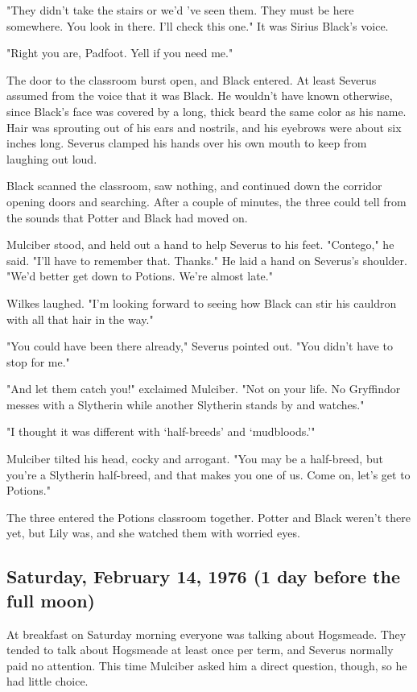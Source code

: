 "They didn't take the stairs or we'd 've seen them. They must be here somewhere. You look in there. I'll check this one." It was Sirius Black's voice.

"Right you are, Padfoot. Yell if you need me."

The door to the classroom burst open, and Black entered. At least Severus assumed from the voice that it was Black. He wouldn't have known otherwise, since Black's face was covered by a long, thick beard the same color as his name. Hair was sprouting out of his ears and nostrils, and his eyebrows were about six inches long. Severus clamped his hands over his own mouth to keep from laughing out loud.

Black scanned the classroom, saw nothing, and continued down the corridor opening doors and searching. After a couple of minutes, the three could tell from the sounds that Potter and Black had moved on.

Mulciber stood, and held out a hand to help Severus to his feet. "Contego," he said. "I'll have to remember that. Thanks." He laid a hand on Severus's shoulder. "We'd better get down to Potions. We're almost late."

Wilkes laughed. "I'm looking forward to seeing how Black can stir his cauldron with all that hair in the way."

"You could have been there already," Severus pointed out. "You didn't have to stop for me."

"And let them catch you!" exclaimed Mulciber. "Not on your life. No Gryffindor messes with a Slytherin while another Slytherin stands by and watches."

"I thought it was different with `half-breeds' and `mudbloods.'"

Mulciber tilted his head, cocky and arrogant. "You may be a half-breed, but you're a Slytherin half-breed, and that makes you one of us. Come on, let's get to Potions."

The three entered the Potions classroom together. Potter and Black weren't there yet, but Lily was, and she watched them with worried eyes.

\subsection{Saturday, February 14, 1976 (1 day before the full moon)}

At breakfast on Saturday morning everyone was talking about Hogsmeade. They tended to talk about Hogsmeade at least once per term, and Severus normally paid no attention. This time Mulciber asked him a direct question, though, so he had little choice.

